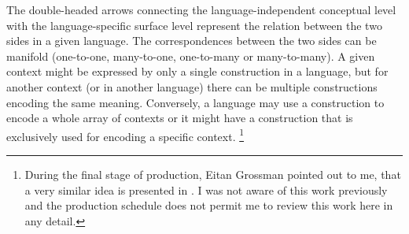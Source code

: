 The double-headed arrows connecting the language-independent conceptual level with the language-specific surface level represent the relation between the two sides in a given language. The correspondences between the two sides can be manifold (one-to-one, many-to-one, one-to-many or many-to-many). 
A given context might be expressed by only a single construction in a language, but for another context (or in another language) there can be multiple constructions encoding the same meaning. 
Conversely, a language may use a construction to encode a whole array of contexts or it might have a construction that is exclusively used for encoding a specific context. 
\footnote{During the final stage of production, Eitan Grossman pointed out to me, that a very similar idea is presented in \citet{Frajzyngier:2003}. 
I was not aware of this work previously and the production schedule does not permit me to review this work here in any detail. }%

